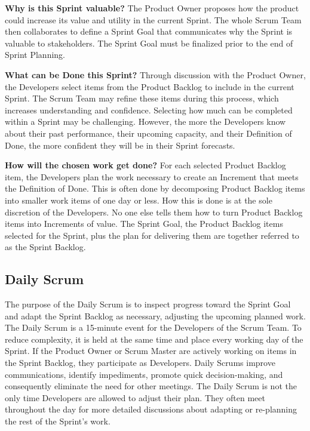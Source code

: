 \begin{flushleft}
	\textbf{Why is this Sprint valuable?} The Product Owner proposes how the product
	could increase its value and utility in the current Sprint. The whole Scrum Team
	then collaborates to define a Sprint Goal that communicates why the Sprint is
	valuable to stakeholders. The Sprint Goal must be finalized prior to the end of
	Sprint Planning.
\end{flushleft}

\begin{flushleft}
	\textbf{What can be Done this Sprint?} Through discussion with the Product Owner,
	the Developers select items from the Product Backlog to include in the current
	Sprint. The Scrum Team may refine these items during this process, which increases
	understanding and confidence. Selecting how much can be completed within a Sprint
	may be challenging. However, the more the Developers know about their past performance,
	their upcoming capacity, and their Definition of Done, the more confident they will
	be in their Sprint forecasts.
\end{flushleft}

\begin{flushleft}
	\textbf{How will the chosen work get done?} For each selected Product Backlog item,
	the Developers plan the work necessary to create an Increment that meets the Definition
	of Done. This is often done by decomposing Product Backlog items into smaller work
	items of one day or less. How this is done is at the sole discretion of the Developers.
	No one else tells them how to turn Product Backlog items into Increments of value.
	The Sprint Goal, the Product Backlog items selected for the Sprint, plus the plan
	for delivering them are together referred to as the Sprint Backlog.
\end{flushleft}

\subsection{Daily Scrum}\label{scrum-daily}

\begin{flushleft}
	The purpose of the Daily Scrum is to inspect progress toward the Sprint Goal and
	adapt the Sprint Backlog as necessary, adjusting the upcoming planned work. The
	Daily Scrum is a 15-minute event for the Developers of the Scrum Team. To reduce
	complexity, it is held at the same time and place every working day of the Sprint.
	If the Product Owner or Scrum Master are actively working on items in the
	Sprint Backlog, they participate as Developers. Daily Scrums improve communications,
	identify impediments, promote quick decision-making, and consequently eliminate the
	need for other meetings. The Daily Scrum is not the only time Developers are allowed
	to adjust their plan. They often meet throughout the day for more detailed discussions
	about adapting or re-planning the rest of the Sprint's work.
\end{flushleft}

